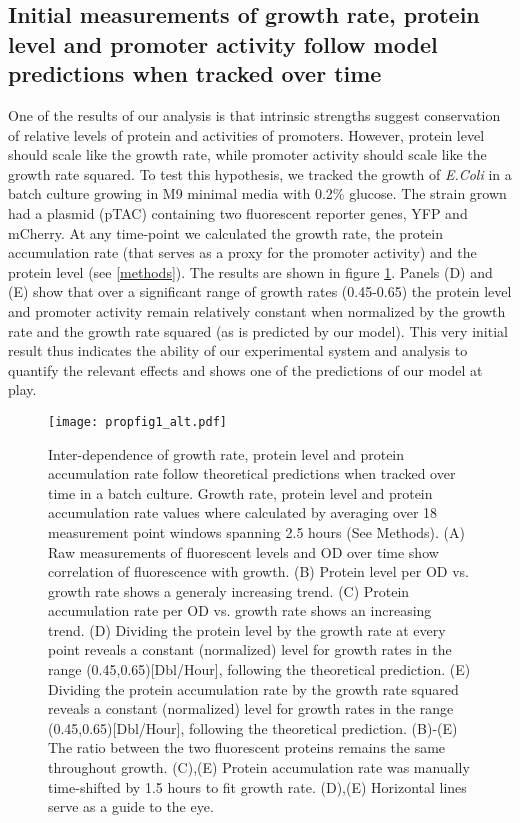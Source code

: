 \documentclass[a4page,notitlepage]{article}
\begin{document}
\subsection{Initial measurements of growth rate, protein level and promoter activity follow model predictions when tracked over time}
One of the results of our analysis is that intrinsic strengths suggest conservation of relative levels of protein and activities of promoters.
However, protein level should scale like the growth rate, while promoter activity should scale like the growth rate squared.
To test this hypothesis, we tracked the growth of \emph{E.Coli} in a batch culture growing in M9 minimal media with 0.2\% glucose.
The strain grown had a plasmid (pTAC) containing two fluorescent reporter genes, YFP and mCherry.
At any time-point we calculated the growth rate, the protein accumulation rate (that serves as a proxy for the promoter activity) and the protein level (see \ref{methods}).
The results are shown in figure \ref{time-gr-fig}.
Panels (D) and (E) show that over a significant range of growth rates (0.45-0.65) the protein level and promoter activity remain relatively constant when normalized by the growth rate and the growth rate squared (as is predicted by our model).
This very initial result thus indicates the ability of our experimental system and analysis to quantify the relevant effects and shows one of the predictions of our model at play.
\begin{figure}[h]
\texttt{[image: propfig1\_alt.pdf]}
\caption{Inter-dependence of growth rate, protein level and protein accumulation rate follow theoretical predictions when tracked over time in a batch culture.
Growth rate, protein level and protein accumulation rate values where calculated by averaging over 18 measurement point windows spanning 2.5 hours (See Methods).
(A) Raw measurements of fluorescent levels and OD over time show correlation of fluorescence with growth.
(B) Protein level per OD vs. growth rate shows a generaly increasing trend.
(C) Protein accumulation rate per OD vs. growth rate shows an increasing trend.
(D) Dividing the protein level by the growth rate at every point reveals a constant (normalized) level for growth rates in the range (0.45,0.65)[Dbl/Hour], following the theoretical prediction.
(E) Dividing the protein accumulation rate by the growth rate squared reveals a constant (normalized) level for growth rates in the range (0.45,0.65)[Dbl/Hour], following the theoretical prediction.
(B)-(E) The ratio between the two fluorescent proteins remains the same throughout growth.
(C),(E) Protein accumulation rate was manually time-shifted by 1.5 hours to fit growth rate.
(D),(E) Horizontal lines serve as a guide to the eye.
}
\label{time-gr-fig}
\end{figure}
\end{document}
